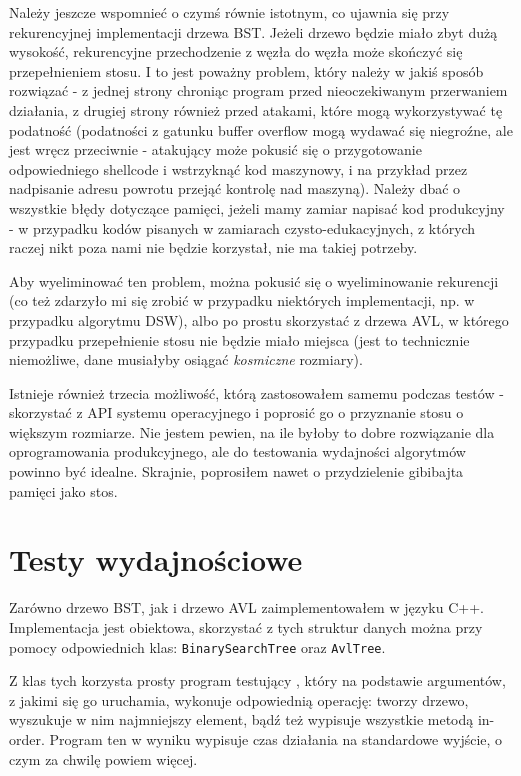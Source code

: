 \documentclass[12pt]{article}
\begin{document}
            Należy jeszcze wspomnieć o czymś równie istotnym, co ujawnia się przy rekurencyjnej implementacji drzewa BST. Jeżeli drzewo będzie miało zbyt dużą wysokość, rekurencyjne przechodzenie z węzła do węzła może skończyć się przepełnieniem stosu. I to jest poważny problem, który należy w jakiś sposób rozwiązać - z jednej strony chroniąc program przed nieoczekiwanym przerwaniem działania, z drugiej strony również przed atakami, które mogą wykorzystywać tę podatność (podatności z gatunku buffer overflow mogą wydawać się niegroźne, ale jest wręcz przeciwnie - atakujący może pokusić się o przygotowanie odpowiedniego shellcode i wstrzyknąć kod maszynowy, i na przykład przez nadpisanie adresu powrotu przejąć kontrolę nad maszyną). Należy dbać o wszystkie błędy dotyczące pamięci, jeżeli mamy zamiar napisać kod produkcyjny - w przypadku kodów pisanych w zamiarach czysto-edukacyjnych, z których raczej nikt poza nami nie będzie korzystał, nie ma takiej potrzeby.
            
            Aby wyeliminować ten problem, można pokusić się o wyeliminowanie rekurencji (co też zdarzyło mi się zrobić w przypadku niektórych implementacji, np. w przypadku algorytmu DSW), albo po prostu skorzystać z drzewa AVL, w którego przypadku przepełnienie stosu nie będzie miało miejsca (jest to technicznie niemożliwe, dane musiałyby osiągać \textit{kosmiczne} rozmiary).
            
            Istnieje również trzecia możliwość, którą zastosowałem samemu podczas testów - skorzystać z API systemu operacyjnego i poprosić go o przyznanie stosu o większym rozmiarze. Nie jestem pewien, na ile byłoby to dobre rozwiązanie dla oprogramowania produkcyjnego, ale do testowania wydajności algorytmów powinno być idealne. Skrajnie, poprosiłem nawet o przydzielenie gibibajta pamięci jako stos.
            \newpage
            
    \section{Testy wydajnościowe}
        Zarówno drzewo BST, jak i drzewo AVL zaimplementowałem w języku C++. Implementacja jest obiektowa, skorzystać z tych struktur danych można przy pomocy odpowiednich klas: \texttt{BinarySearchTree} oraz \texttt{AvlTree}.
        
        Z klas tych korzysta prosty program testujący , który na podstawie argumentów, z jakimi się go uruchamia, wykonuje odpowiednią operację: tworzy drzewo, wyszukuje w nim najmniejszy element, bądź też wypisuje wszystkie metodą in-order. Program ten w wyniku wypisuje czas działania na standardowe wyjście, o czym za chwilę powiem więcej.
        
\end{document}
